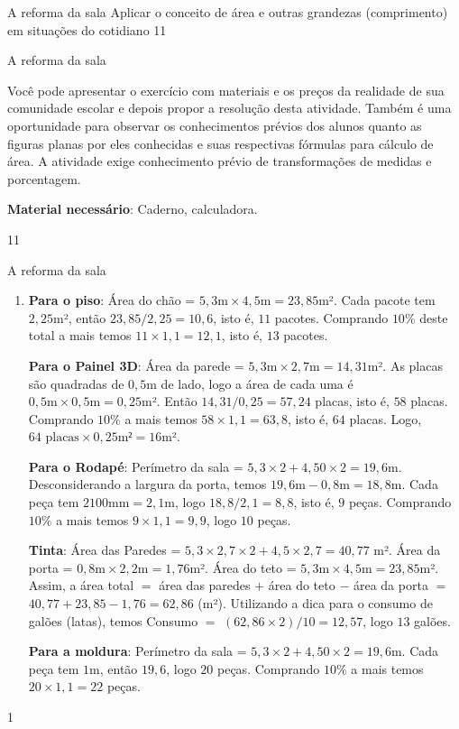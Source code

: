 \def\currentcolor{session1}
\begin{objectives}{A reforma da sala}
{
  Aplicar o conceito de área e outras grandezas (comprimento) em situações do cotidiano
}{1}{1}
\end{objectives}
\begin{sugestions}{A reforma da sala}
{
  Você pode apresentar o exercício com materiais e os preços da realidade de sua comunidade escolar e depois propor a resolução desta atividade. Também é uma oportunidade para observar os conhecimentos prévios dos alunos quanto as figuras planas por eles conhecidas e suas respectivas fórmulas para cálculo de área. A atividade exige conhecimento prévio de transformações de medidas e porcentagem.

  \textbf{Material necessário}: Caderno, calculadora.

}{1}{1}
\end{sugestions}
\begin{answer}{A reforma da sala}
{
\begin{enumerate}
  \item 
  \textbf{Para o piso}: Área do chão = $5{,}3 \text{m} \times 4{,}5 \text{m} = 23{,}85$m². Cada pacote tem $2{,}25$m², então $23{,}85/2,25=10{,}6$, isto é, $11$ pacotes. Comprando $10\%$ deste total a mais temos $11 \times 1{,}1= 12{,}1$, isto é, $13$ pacotes.

  \textbf{Para o Painel 3D}: Área da parede = $5{,}3 \text{m} \times 2{,}7 \text{m} = 14{,}31$m². As placas são quadradas de $0{,}5$m de lado, logo a área de cada uma é $0{,}5 \text{m} \times 0{,}5 \text{m} = 0{,}25$m². Então $14{,}31/0,25 = 57{,}24$ placas, isto é, $58$ placas. Comprando $10\%$ a mais temos $58 \times 1{,}1= 63{,}8$, isto é, $64$ placas. Logo, $64 \text{ placas} \times 0{,}25 \text{m²} = 16 $m².

  \textbf{Para o Rodapé}: Perímetro da sala = $5{,}3 \times 2 + 4,50 \times 2 = 19{,}6$m. Desconsiderando a largura da porta, temos $19{,}6 \text{m} - 0{,}8 \text{m} = 18{,}8$m. Cada peça tem $2100 \text{mm} = 2{,}1$m, logo $18{,}8 / 2{,}1= 8{,}8$, isto é, $9$ peças. Comprando $10\%$ a mais temos $9 \times 1{,}1 = 9{,}9$, logo $10$ peças.

  \textbf{Tinta}: Área das Paredes = $5{,}3 \times 2{,}7 \times 2 + 4{,}5 \times 2{,}7 = 40{,}77$ m². Área da porta = $0{,}8 \text{m} \times 2{,}2 \text{m} = 1{,}76$m². Área do teto = $5{,}3 \text{m} \times 4{,}5 \text{m} = 23{,}85$m². Assim, a área total $=$ área das paredes $+$ área do teto $-$ área da porta $=$ $40{,}77+23{,}85 - 1{,}76 =62,86$ (m²). Utilizando a dica para o consumo de galões (latas), temos Consumo $=$ $(62{,}86 \times 2) /10=12{,}57$, logo $13$ galões. 

  \textbf{Para a moldura}: Perímetro da sala = $5{,}3 \times 2 + 4{,}50 \times 2 = 19{,}6$m. Cada peça tem $1$m, então $19{,}6$, logo $20$ peças. Comprando $10\%$ a mais temos $20 \times 1{,}1 = 22$ peças.
\end{enumerate}

}{1}
\end{answer}
